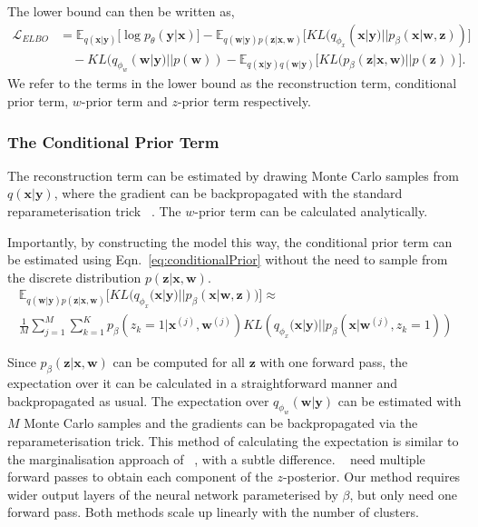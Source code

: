 \documentclass{article} \usepackage{iclr2017_conference,times}
\begin{document}
The lower bound can then be written as,
\begin{equation}
\begin{aligned}
 \mathcal{L}_{ELBO} &= \mathbb{E}_{q(\pmb{x}|\pmb{y})}\big[ \log{p}_{\theta}(\pmb{y}|\pmb{x}) \big] - \mathbb{E}_{q(\pmb{w}| \pmb{y})p(\pmb{z}| \pmb{x}, \pmb{w})}\big[ KL(q_{\phi_x}(\pmb{x}| \pmb{y})|| p_{\beta}(\pmb{x}|\pmb{w},\pmb{z})) \big] \\
 			 &\quad - KL(q_{\phi_w}(\pmb{w}| \pmb{y})|| p(\pmb{w})) -  \mathbb{E}_{q(\pmb{x}|\pmb{y})q(\pmb{w}|\pmb{y})}\big[ KL(p_{\beta}(\pmb{z}| \pmb{x},\pmb{w})|| p(\pmb{z})) \big].
  \label{eq:elbo}\end{aligned}
\end{equation}
We refer to the terms in the lower bound as the reconstruction term, conditional prior term, $w$-prior term and $z$-prior term respectively.

\subsubsection{The Conditional Prior Term}
The reconstruction term can be estimated by drawing Monte Carlo samples from $q(\pmb{x}|\pmb{y})$, where the gradient can be backpropagated with the standard reparameterisation trick ~\citep{kingma2013auto}. The $w$-prior term can be calculated analytically.

Importantly, by constructing the model this way, the conditional prior term can be estimated using Eqn.~\ref{eq:conditionalPrior} without the need to sample from the discrete distribution $p(\pmb{z}|\pmb{x}, \pmb{w})$.
\begin{equation}
\begin{aligned}
 	\mathbb{E}_{q(\pmb{w}| \pmb{y})p(\pmb{z}| \pmb{x}, \pmb{w})}\Big[ KL\big(q_{\phi_x}(\pmb{x}| \pmb{y})|| p_{\beta}(\pmb{x}|\pmb{w},\pmb{z})\big)\Big] \approx \qquad \qquad\\
 	\frac{1}{M}\sum_{j=1}^M \sum_{k=1}^K p_{\beta}(z_k = 1 | \pmb{x}^{(j)},\pmb{w}^{(j)}) KL\left(q_{\phi_x}(\pmb{x}| \pmb{y})|| p_{\beta}(\pmb{x}| \pmb{w}^{(j)}, z_k = 1)\right)
\end{aligned}
\label{eq:conditionalPrior}
\end{equation}

Since $p_{\beta}(\pmb{z}| \pmb{x}, \pmb{w})$ can be computed for all $\pmb{z}$ with one forward pass, the expectation over it can be calculated in a straightforward manner and backpropagated as usual. The expectation over $q_{\phi_w}(\pmb{w}| \pmb{y})$ can be estimated with $M$ Monte Carlo samples and the gradients can be backpropagated via the reparameterisation trick. This method of calculating the expectation is similar to the marginalisation approach of ~\cite{kingma2014semi}, with a subtle difference. ~\cite{kingma2014semi} need multiple forward passes to obtain each component of the $z$-posterior. Our method requires wider output layers of the neural network parameterised by $\beta$, but only need one forward pass. Both methods scale up linearly with the number of clusters.
\end{document}
